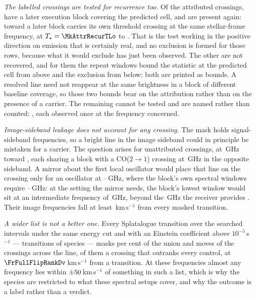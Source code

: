 \emph{The labelled crossings are tested for recurrence too.} Of the
\MkAttr{} attributed crossings, \MkAttrTested{} have a later execution block
covering the predicted cell, and \MkAttrRecur{} are present again: toward
\MkAttrRecurStars{} a later block carries its own threshold crossing at the
same stellar-frame frequency, at $T_\star=\MkAttrRecurTLo$ to
\MkAttrRecurTHi. That is the test working in the positive direction on
emission that is certainly real, and no exclusion is formed for those rows,
because what it would exclude has just been observed. The other
\MkAttrExcl{} are not recovered, and for them the repeat windows bound the
statistic at the predicted cell from above and the exclusion from below;
both are printed as bounds. A resolved line need not reappear at the same
brightness in a block of different baseline coverage, so those two bounds
bear on the attribution rather than on the presence of a carrier. The
remaining \MkAttrUntest{} cannot be tested and are named rather than
counted: \MkAttrUntestNames, each observed once at the frequency
concerned.

\emph{Image-sideband leakage does not account for any crossing.} The mask
holds signal-sideband frequencies, so a bright line in the image sideband
could in principle be mistaken for a carrier. The question arises for
\MkImgN{} unattributed crossings, at \MkImgFreqs\,GHz toward \MkImgStar, each
sharing a block with a CO($2\to1$) crossing at \MkImgPartner\,GHz in the
opposite sideband. A mirror about the first local oscillator would place that
line on the crossing only for an oscillator at
\MkImgLOReqLo--\MkImgLOReqHi\,GHz, where the block's own spectral windows
require \MkImgLOLo--\MkImgLOHi\,GHz: at the setting the mirror needs, the
block's lowest window would sit at an intermediate frequency of
\MkImgIFReq\,GHz, beyond the \MkImgIFMax\,GHz the receiver provides
\citep{ALMAHandbook}. Their image frequencies fall at least
\MkImgDvMin\,km\,s$^{-1}$ from every masked transition.

\emph{A wider list is not a better one.} Every Splatalogue transition over the
searched intervals under the same energy cut and with an Einstein coefficient
above $10^{-5}$\,s$^{-1}$ --- \MaskDbTrans{} transitions of \MaskDbCarriers{}
species --- masks \MaskDbPctUnion{} per cent of the union and moves
\FrFullNFlip{} of the \NCross{} crossings across the line,
\FrFullNFlipRankWord{} of them a crossing that outranks every control, at
$\FrFullFlipRankDv$\,km\,s$^{-1}$ from a \FrFullFlipRankChem{} transition. At
these frequencies almost any frequency lies within
$\pm50$\,km\,s$^{-1}$ of something in such a list, which is why the
species are restricted to what these spectral setups cover, and why the
outcome is a label rather than a verdict.
